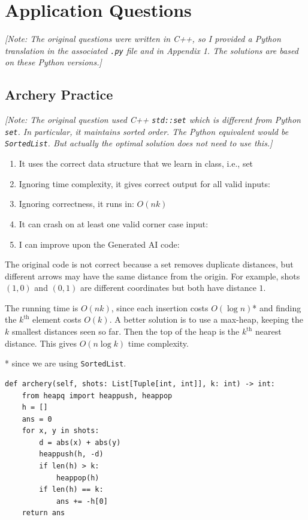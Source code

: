 \documentclass[12pt]{article}
\renewcommand{\t}{\texttt}
\begin{document}
\section{Application Questions}
\textit{[Note: The original questions were written in C++, so I provided a Python translation in the associated \t{.py} file and in Appendix 1. The solutions are based on these Python versions.]}
\subsection{Archery Practice}
\textit{[Note: The original question used C++ \t{std::set} which is different from Python \t{set}. In particular, it maintains sorted order. The Python equivalent would be \t{SortedList}. But actually the optimal solution does not need to use this.]}

\begin{enumerate}
\item It uses the correct data structure that we learn in class, i.e., set 
\item Ignoring time complexity, it gives correct output for all valid inputs: 
\item Ignoring correctness, it runs in: $\boxed{O(nk)}$
\item It can crash on at least one valid corner case input: 
\item I can improve upon the Generated AI code: 
\end{enumerate}

The original code is not correct because a set removes duplicate distances, but different arrows may have the same distance from the origin. For example, shots $(1,0)$ and $(0,1)$ are different coordinates but both have distance $1$.

The running time is $O(nk)$, since each insertion costs $O(\log n)$* and finding the $k^{\text{th}}$ element costs $O(k)$. A better solution is to use a max-heap, keeping the $k$ smallest distances seen so far. Then the top of the heap is the $k^{\text{th}}$ nearest distance. This gives $O(n\log k)$ time complexity.

* since we are using \t{SortedList}.

\begin{verbatim}
def archery(self, shots: List[Tuple[int, int]], k: int) -> int:
    from heapq import heappush, heappop
    h = []
    ans = 0
    for x, y in shots:
        d = abs(x) + abs(y)
        heappush(h, -d)
        if len(h) > k:
            heappop(h)
        if len(h) == k:
            ans += -h[0]
    return ans
\end{verbatim}
\newpage
\end{document}
